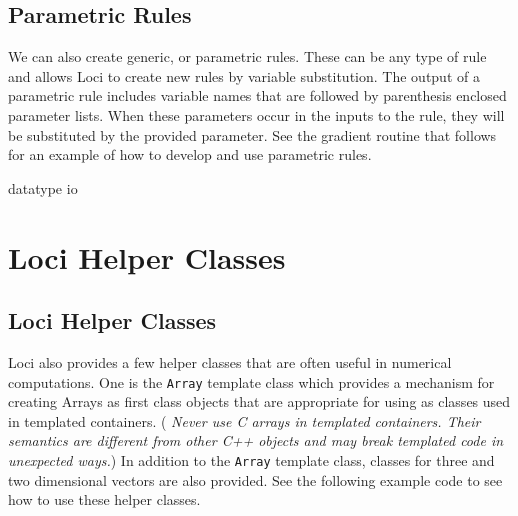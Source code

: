 \documentclass[10pt,epsf]{book}
\begin{document}


\section{Parametric Rules}

We can also create generic, or parametric rules.  These can be any
type of rule and allows Loci to create new rules by variable
substitution.  The output of a parametric rule includes variable names
that are followed by parenthesis enclosed parameter lists.  When these
parameters occur in the inputs to the rule, they will be substituted
by the provided parameter.  See the gradient routine that follows for
an example of how to develop and use parametric rules.




 {datatype}
 {io}

\chapter{Loci Helper Classes}
\section{Loci Helper Classes}

Loci also provides a few helper classes that are often useful in
numerical computations.  
One is the {\tt Array} template class which provides a
mechanism for creating Arrays as first class objects that are
appropriate for using as classes used in templated containers. ({\it
Never use C arrays in templated containers.  Their semantics are
different from other C++ objects and may break templated code in
unexpected ways.})  In addition to the {\tt Array} template class,
classes for three and two dimensional vectors are also provided.  See
the following example code to see how to use these helper classes.


\end{document}
